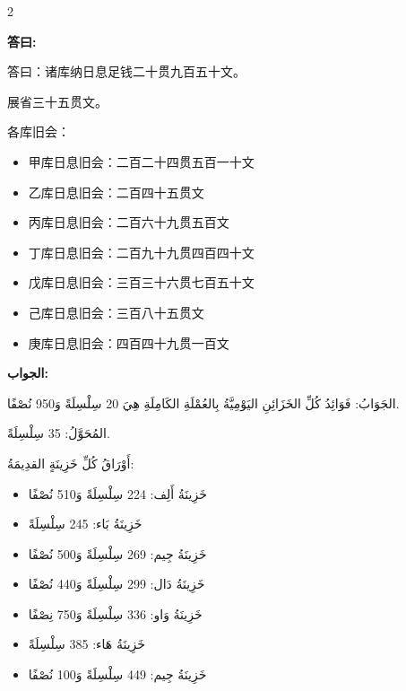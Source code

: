 \documentclass[11pt,a4paper]{article}
\newcommand{\ar}[1]{\arabicfont\beginR #1\endR}
\newenvironment{bilingual}{%
  \begin{paracol}{2}
}{%
  \end{paracol}
}
\newcommand{\cnlabel}[1]{\textcolor{algocolor}{\textbf{#1}}}
\newcommand{\arlabel}[1]{\ar{\textcolor{algocolor}{\textbf{#1}}}}
\begin{document}
\begin{bilingual}

\begin{leftcolumn*}
\cnlabel{答曰:}

答曰：诸库纳日息足钱二十贯九百五十文。

展省三十五贯文。

各库旧会：
\begin{itemize}
  \item 甲库日息旧会：二百二十四贯五百一十文
  \item 乙库日息旧会：二百四十五贯文
  \item 丙库日息旧会：二百六十九贯五百文
  \item 丁库日息旧会：二百九十九贯四百四十文
  \item 戊库日息旧会：三百三十六贯七百五十文
  \item 己库日息旧会：三百八十五贯文
  \item 庚库日息旧会：四百四十九贯一百文
\end{itemize}
\end{leftcolumn*}

\begin{rightcolumn*}
\arlabel{الجواب:}

\ar{الجَوَابُ: فَوَائِدُ كُلِّ الخَزَائِنِ اليَوْمِيَّةُ بِالعُمْلَةِ الكَامِلَةِ هِيَ 20 سِلْسِلَةً وَ950 نُصْفًا.}

\ar{المُحَوَّلُ: 35 سِلْسِلَةً.}

\ar{أَوْرَاقُ كُلِّ خَزِينَةٍ القدِيمَةُ:}
\begin{itemize}
  \item \ar{خَزِينَةُ أَلِف: 224 سِلْسِلَةً وَ510 نُصْفًا}
  \item \ar{خَزِينَةُ بَاء: 245 سِلْسِلَةً}
  \item \ar{خَزِينَةُ جِيم: 269 سِلْسِلَةً وَ500 نُصْفًا}
  \item \ar{خَزِينَةُ دَال: 299 سِلْسِلَةً وَ440 نُصْفًا}
  \item \ar{خَزِينَةُ وَاو: 336 سِلْسِلَةً وَ750 نِصْفًا}
  \item \ar{خَزِينَةُ هَاء: 385 سِلْسِلَةً}
  \item \ar{خَزِينَةُ جِيم: 449 سِلْسِلَةً وَ100 نُصْفًا}
\end{itemize}
\end{rightcolumn*}

\end{bilingual}

\newpage

\end{document}

